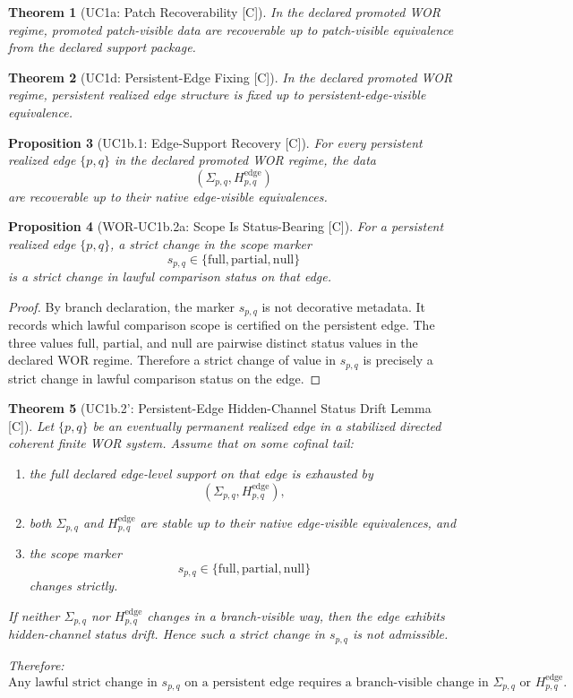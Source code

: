 \documentclass[11pt]{article}
\newtheorem{theorem}{Theorem}[section]
\newtheorem{proposition}[theorem]{Proposition}
\theoremstyle{definition}
\theoremstyle{remark}
\newcommand{\C}{\textnormal{[C]}}
\newcommand{\Sigmaedge}{\Sigma_{p,q}}
\newcommand{\Hedge}{H^{\mathrm{edge}}_{p,q}}
\newcommand{\scopepq}{s_{p,q}}
\begin{document}
\begin{theorem}[UC1a: Patch Recoverability {\C}]
In the declared promoted WOR regime, promoted patch-visible data are recoverable up to patch-visible equivalence from the declared support package.
\end{theorem}

\begin{theorem}[UC1d: Persistent-Edge Fixing {\C}]
In the declared promoted WOR regime, persistent realized edge structure is fixed up to persistent-edge-visible equivalence.
\end{theorem}

\begin{proposition}[UC1b.1: Edge-Support Recovery {\C}]
For every persistent realized edge \(\{p,q\}\) in the declared promoted WOR regime, the data
\[
(\Sigmaedge,\Hedge)
\]
are recoverable up to their native edge-visible equivalences.
\end{proposition}

\begin{proposition}[WOR-UC1b.2a: Scope Is Status-Bearing {\C}]
For a persistent realized edge \(\{p,q\}\), a strict change in the scope marker
\[
\scopepq\in\{\mathrm{full},\mathrm{partial},\mathrm{null}\}
\]
is a strict change in lawful comparison status on that edge.
\end{proposition}

\begin{proof}
By branch declaration, the marker \(\scopepq\) is not decorative metadata. It records which lawful comparison scope is certified on the persistent edge. The three values \(\mathrm{full}\), \(\mathrm{partial}\), and \(\mathrm{null}\) are pairwise distinct status values in the declared WOR regime. Therefore a strict change of value in \(\scopepq\) is precisely a strict change in lawful comparison status on the edge. \qedhere
\end{proof}

\begin{theorem}[UC1b.2': Persistent-Edge Hidden-Channel Status Drift Lemma {\C}]
Let \(\{p,q\}\) be an eventually permanent realized edge in a stabilized directed coherent finite WOR system. Assume that on some cofinal tail:
\begin{enumerate}[label=(\arabic*)]
    \item the full declared edge-level support on that edge is exhausted by
    \[
    (\Sigmaedge,\Hedge),
    \]
    \item both \(\Sigmaedge\) and \(\Hedge\) are stable up to their native edge-visible equivalences, and
    \item the scope marker
    \[
    \scopepq\in\{\mathrm{full},\mathrm{partial},\mathrm{null}\}
    \]
    changes strictly.
\end{enumerate}
If neither \(\Sigmaedge\) nor \(\Hedge\) changes in a branch-visible way, then the edge exhibits hidden-channel status drift. Hence such a strict change in \(\scopepq\) is not admissible.

Therefore:
\[
\boxed{
\text{Any lawful strict change in }\scopepq\text{ on a persistent edge requires a branch-visible change in }
\Sigmaedge\text{ or }\Hedge.
}
\]
\end{theorem}
\end{document}
